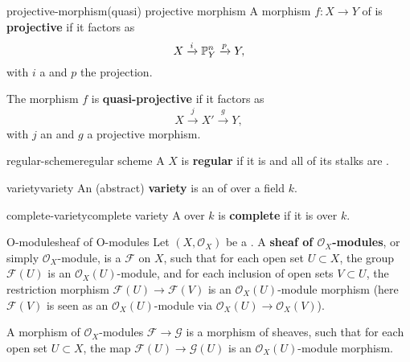 \begin{topic}{projective-morphism}{(quasi) projective morphism}
    A morphism $f : X \to Y$ of  is \textbf{projective} if it factors as
    \[ X \xrightarrow{i} \mathbb{P}^n_Y \xrightarrow{p} Y , \]
    with $i$ a  and $p$ the projection.
    
    The morphism $f$ is \textbf{quasi-projective} if it factors as
    \[ X \xrightarrow{j} X' \xrightarrow{g} Y , \]
    with $j$ an  and $g$ a projective morphism.
\end{topic}

\begin{topic}{regular-scheme}{regular scheme}
    A  $X$ is \textbf{regular} if it is  and all of its stalks are .
\end{topic}

\begin{topic}{variety}{variety}
    An (abstract) \textbf{variety} is an    of  over a field $k$.
\end{topic}

\begin{topic}{complete-variety}{complete variety}
    A  over $k$ is \textbf{complete} if it is  over $k$.
\end{topic}

\begin{topic}{O-module}{sheaf of O-modules}
    Let $(X, \mathcal{O}_X)$ be a . A \textbf{sheaf of $\mathcal{O}_X$-modules}, or simply $\mathcal{O}_X$-module, is a  $\mathcal{F}$ on $X$, such that for each open set $U \subset X$, the group $\mathcal{F}(U)$ is an $\mathcal{O}_X(U)$-module, and for each inclusion of open sets $V \subset U$, the restriction morphism $\mathcal{F}(U) \to \mathcal{F}(V)$ is an $\mathcal{O}_X(U)$-module morphism (here $\mathcal{F}(V)$ is seen as an $\mathcal{O}_X(U)$-module via $\mathcal{O}_X(U) \to \mathcal{O}_X(V)$).
    
    A morphism of $\mathcal{O}_X$-modules $\mathcal{F} \to \mathcal{G}$ is a morphism of sheaves, such that for each open set $U \subset X$, the map $\mathcal{F}(U) \to \mathcal{G}(U)$ is an $\mathcal{O}_X(U)$-module morphism.
\end{topic}

